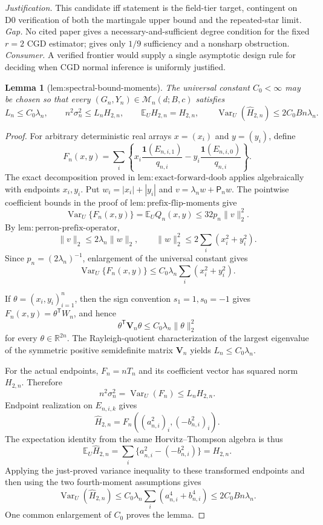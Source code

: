 \documentclass{article}
\newtheorem{lemma}{Lemma}
\begin{document}
\par\smallskip\noindent \textit{Justification.} This candidate iff statement is the field-tier target, contingent on D0 verification of both the martingale upper bound and the repeated-star limit. \textit{Gap.} No cited paper gives a necessary-and-sufficient degree condition for the fixed \(r=2\) CGD estimator; \cite{KandirosPipisDaskalakisHarshaw2024CGD} gives only \(1/9\) sufficiency and a nonsharp obstruction. \textit{Consumer.} A verified frontier would supply a single asymptotic design rule for deciding when CGD normal inference is uniformly justified.

\begin{lemma}[lem:spectral-bound-moments]\label{lem:spectral-bound-moments}
The universal constant \(C_0<\infty\) may be chosen so that every \((G_n,Y_n)\in\mathcal M_n(d;B,c)\) satisfies \[L_n\le C_0\lambda_n,\qquad n^2\sigma_n^2\le L_nH_{2,n},\qquad \mathbb E_U\widehat H_{2,n}=H_{2,n},\qquad \operatorname{Var}_U(\widehat H_{2,n})\le2C_0Bn\lambda_n.\]
\end{lemma}
\begin{proof}
For arbitrary deterministic real arrays \(x=(x_i)\) and \(y=(y_i)\), define
\[
 F_n(x,y)=\sum_i\left\{x_i\frac{\mathbf1(E_{n,i,1})}{q_{n,i}}
 -y_i\frac{\mathbf1(E_{n,i,0})}{q_{n,i}}\right\}.
\]
The exact decomposition proved in \(\mathrm{lem:exact\text{-}forward\text{-}doob}\) applies algebraically with endpoints \(x_i,y_i\).  Put \(w_i=|x_i|+|y_i|\) and \(v=\lambda_nw+\mathsf P_nw\).  The pointwise coefficient bounds in the proof of \(\mathrm{lem:prefix\text{-}flip\text{-}moments}\) give
\[
 \operatorname{Var}_U\{F_n(x,y)\}=\mathbb E_UQ_n(x,y)
 \le32p_n\|v\|_2^2.
\]
By \(\mathrm{lem:perron\text{-}prefix\text{-}operator}\),
\[
 \|v\|_2\le2\lambda_n\|w\|_2,\qquad
 \|w\|_2^2\le2\sum_i(x_i^2+y_i^2).
\]
Since \(p_n=(2\lambda_n)^{-1}\), enlargement of the universal constant gives
\[
 \operatorname{Var}_U\{F_n(x,y)\}
 \le C_0\lambda_n\sum_i(x_i^2+y_i^2).
\]

If \(\theta=(x_i,y_i)_{i=1}^n\), then the sign convention \(s_1=1,s_0=-1\) gives \(F_n(x,y)=\theta^{\mathsf T}W_n\), and hence
\[
 \theta^{\mathsf T}\mathbf V_n\theta\le C_0\lambda_n\|\theta\|_2^2
\]
for every \(\theta\in\mathbb R^{2n}\).  The Rayleigh-quotient characterization of the largest eigenvalue of the symmetric positive semidefinite matrix \(\mathbf V_n\) yields \(L_n\le C_0\lambda_n\).

For the actual endpoints, \(F_n=nT_n\) and its coefficient vector has squared norm \(H_{2,n}\).  Therefore
\[
 n^2\sigma_n^2=\operatorname{Var}_U(F_n)
 \le L_nH_{2,n}.
\]
Endpoint realization on \(E_{n,i,k}\) gives
\[
 \widehat H_{2,n}=F_n((a_{n,i}^2)_i,(-b_{n,i}^2)_i).
\]
The expectation identity from the same Horvitz--Thompson algebra is thus
\[
 \mathbb E_U\widehat H_{2,n}=\sum_i\{a_{n,i}^2-(-b_{n,i}^2)\}=H_{2,n}.
\]
Applying the just-proved variance inequality to these transformed endpoints and then using the two fourth-moment assumptions gives
\[
 \operatorname{Var}_U(\widehat H_{2,n})
 \le C_0\lambda_n\sum_i(a_{n,i}^4+b_{n,i}^4)
 \le2C_0Bn\lambda_n.
\]
One common enlargement of \(C_0\) proves the lemma.
\end{proof}
\end{document}
